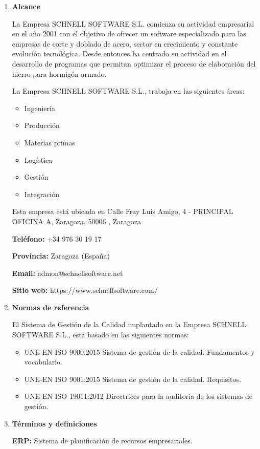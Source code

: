 \documentclass[10pt,a4paper]{article}
\begin{document}
\begin{enumerate}
\item \textbf{Alcance}

La Empresa SCHNELL SOFTWARE S.L. comienza su actividad empresarial en el año 2001 con el objetivo de ofrecer un software especializado para las empresas de corte y doblado de acero, sector en crecimiento y constante evolución tecnológica. Desde entonces ha centrado su actividad en el desarrollo de programas que permitan optimizar el proceso de elaboración del hierro para hormigón armado.

La Empresa SCHNELL SOFTWARE S.L., trabaja en las siguientes áreas:
\begin{itemize}
\item Ingeniería
\item Producción
\item Materias primas
\item Logística
\item Gestión
\item Integración
\end{itemize}

Esta empresa está ubicada en Calle Fray Luis Amigo, 4 - PRINCIPAL OFICINA A, Zaragoza, 50006 , Zaragoza

\textbf{Teléfono:} +34 976 30 19 17

\textbf{Provincia: }Zaragoza (España)

\textbf{Email: }admon@schnellsoftware.net

\textbf{Sitio web: }https://www.schnellsoftware.com/

\item \textbf{Normas de referencia}

El Sistema de Gestión de la Calidad implantado en la Empresa SCHNELL SOFTWARE S.L., está basado en las siguientes normas:
\begin{itemize}
\item UNE-EN ISO 9000:2015 Sistema de gestión de la calidad. Fundamentos y vocabulario.
\item UNE-EN ISO 9001:2015 Sistema de gestión de la calidad. Requisitos.
\item UNE-EN ISO 19011:2012 Directrices para la auditoría de los sistemas de gestión.
\end{itemize}

\item \textbf{Términos y definiciones}

\textbf{ERP: }Sistema de planificación de recursos empresariales.


\end{enumerate}
\end{document}
